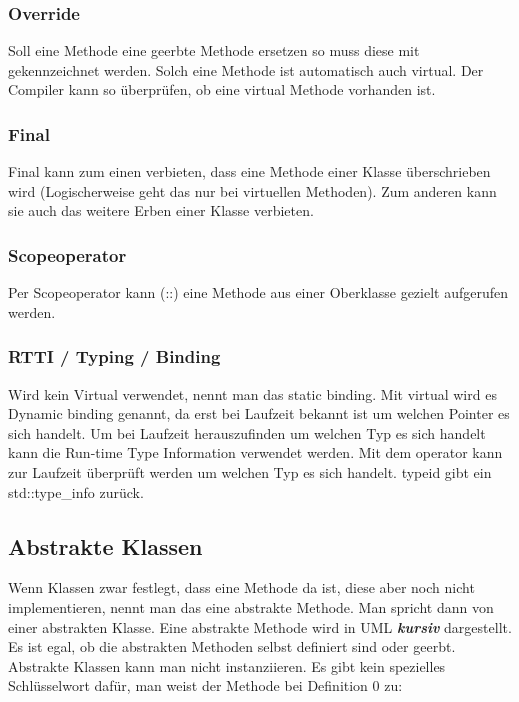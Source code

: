 \subsubsection{Override}

Soll eine Methode eine geerbte Methode ersetzen so muss diese mit  gekennzeichnet werden. 
Solch eine Methode ist automatisch auch virtual.
Der Compiler kann so überprüfen, ob eine virtual Methode vorhanden ist.

\subsubsection{Final}

Final kann zum einen verbieten, dass eine Methode einer Klasse überschrieben wird
(Logischerweise geht das nur bei virtuellen Methoden). 
Zum anderen kann sie auch das weitere Erben einer Klasse verbieten. 

\subsubsection{Scopeoperator}

Per Scopeoperator kann (::) eine Methode aus einer Oberklasse gezielt aufgerufen werden.



\subsubsection{RTTI / Typing / Binding}

Wird kein Virtual verwendet, nennt man das static binding. 
Mit virtual wird es Dynamic binding genannt, da erst bei Laufzeit bekannt ist um welchen Pointer es sich handelt. 
Um bei Laufzeit herauszufinden um welchen Typ es sich handelt kann die Run-time Type Information verwendet werden. 
Mit dem  operator kann zur Laufzeit überprüft werden um welchen Typ es sich handelt. 
typeid gibt ein std::type\_info zurück. 



\subsection{Abstrakte Klassen}

Wenn Klassen zwar festlegt, dass eine Methode da ist, diese aber noch nicht implementieren, nennt man das eine abstrakte Methode. 
Man spricht dann von einer abstrakten Klasse.
Eine abstrakte Methode wird in UML \textit{\textbf{kursiv}} dargestellt.
Es ist egal, ob die abstrakten Methoden selbst definiert sind oder geerbt. 
Abstrakte Klassen kann man nicht instanziieren.
Es gibt kein spezielles Schlüsselwort dafür, man weist der Methode bei Definition 0 zu: 

